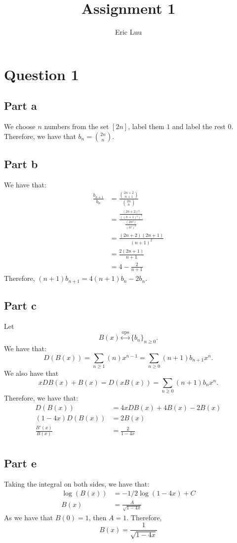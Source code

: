 \documentclass[]{article}
\title{Assignment 1}
\author{Eric Luu}
\newcommand{\ops}{\overset{\text{ops}}{\leftrightarrow}}
\begin{document}
\maketitle
\section{Question 1}
\subsection{Part a}
We choose $n$ numbers from the set $[2n]$, label them $1$ and label the rest $0$. Therefore, we have that $b_n = \binom{2n}{n}$.
\subsection{Part b}
We have that:
\begin{align*}
	\frac{b_{n+1}}{b_n} &= \frac{\binom{2n + 2}{n+1}}{\binom{2n}{n}}\\
	&= 
	\frac{\frac{(2n + 2)!}{((n+1)!)^2}}{\frac{(2n!)}{(n!)^2}}\\
	&=
	\frac{(2n + 2)(2n + 1)}{(n+1)^2}\\
	&=\frac{2(2n + 1)}{n+1}\\
	&= 4 - \frac{2}{n+ 1}
\end{align*}
Therefore, $(n+1)b_{n+1} = 4(n+1) b_n - 2 b_n$. 
\subsection*{Part c}
Let \begin{equation}
	B(x) \ops \lbrace b_n \rbrace_{n \geq 0}. 
\end{equation}
We have that:
\begin{equation}
	D (B(x)) = \sum_{n \geq 1} (n) x^{n-1} = \sum_{n \geq 0} (n + 1) b_{n+1} x^n.
\end{equation}
We also have that \begin{equation}
	x D B(x) + B(x) = D (x B(x)) = \sum_{n \geq 0} (n + 1) b_n x^{n}. 
\end{equation}
Therefore, we have that:
\begin{align*}
	D(B(x)) &= 4 xD B(x) + 4 B(x) - 2 B(x)\\
	(1-4x) D(B(x))&= 2 B(x)\\
	\frac{B'(x)}{B(x)} &= \frac{2}{1-4x}\\
\end{align*}
\subsection{Part e}
Taking the integral on both sides, we have that:
\begin{align*}
	\log(B(x)) &= -1/2 \log(1-4x) + C\\
	B(x) &= \frac{A}{\sqrt{1-4x}}
\end{align*}
As we have that $B(0) = 1$, then $A = 1$. Therefore,
\begin{equation}
	B(x) = \frac{1}{\sqrt{1-4x}}
\end{equation}
\end{document}
